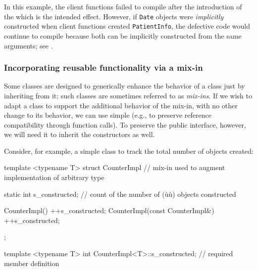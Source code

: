 \noindent 
In this example, the client functions failed to compile after the introduction of the  which is the intended effect. However, if \lstinline!Date! objects were \emph{implicitly} constructed when client functions created \lstinline!PatientInfo!, the defective code would continue to compile because both  can be implicitly constructed from the same arguments; see .

\subsubsection[Incorporating reusable functionality via a mix-in]{Incorporating reusable functionality via a mix-in}\label{incorporating-reusable-functionality-via-a-mix-in-class}

Some classes are designed to generically enhance the behavior of a class
just by inheriting from it; such classes are sometimes referred to as
\emph{mix-ins}. If we wish to adapt a class to support the additional
behavior of the mix-in, with no other change to its behavior, we can use
simple  (e.g., to preserve reference
compatibility through function calls). To preserve the public interface,
however, we will need it to inherit the constructors as well.

Consider, for example, a simple class to track the total number of
objects created:

\begin{emcppslisting}[emcppsbatch=e8]
template <typename T>
struct CounterImpl  // mix-in used to augment implementation of arbitrary type
{
    static int s_constructed;  // count of the number of (ù{}ù) objects constructed

    CounterImpl()                   { ++s_constructed; }
    CounterImpl(const CounterImpl&) { ++s_constructed; }
};

template <typename T>
int CounterImpl<T>::s_constructed;  // required member definition
\end{emcppslisting}
    
